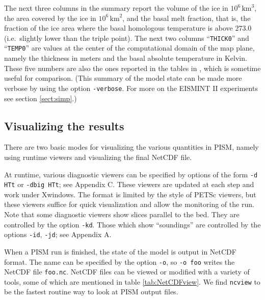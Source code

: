 \documentclass[11pt,final]{amsart}
\begin{document}
The next three columns in the summary report the volume of the ice in $10^6 \,\text{km}^3$, the area covered by the ice in $10^6\,\text{km}^2$, and the basal melt fraction, that is, the fraction of the ice area where the basal homologous temperature is above $273.0$ (i.e.~slightly lower than the triple point).  The next two columns ``\texttt{THICK0}'' and ``\texttt{TEMP0}'' are values at the center of the computational domain of the map plane, namely the thickness in meters and the basal absolute temperature in Kelvin.  These five numbers are also the ones reported in the tables in \cite{EISMINT00}, which is sometime useful for comparison.  (This summary of the model state can be made more verbose by using the option \verb|-verbose|.  For more on the EISMINT II experiments see section \ref{sect:simp}.)

\subsection{Visualizing the results}  There are two basic modes for visualizing the various quantities in PISM, namely using runtime viewers and visualizing the final NetCDF file.

At runtime, various diagnostic viewers can be specified by options of the form \verb|-d HTt| or \verb|-dbig HTt|; see Appendix C.  These viewers are updated at each step and work under Xwindows.  The format is limited by the style of PETSc viewers, but these viewers suffice for quick visualization and allow the monitoring of the run.  Note that some diagnostic viewers show slices parallel to the bed.  They are controlled by the option \verb|-kd|.  Those which show ``soundings'' are controlled by the options \verb|-id|, \verb|-jd|; see Appendix A.

When a PISM run is finished, the state of the model is output in NetCDF format.  The name can be specified by the option \verb|-o|, so \verb|-o foo| writes the NetCDF file \verb|foo.nc|.  NetCDF files can be viewed or modified with a variety of tools, some of which are mentioned in table \ref{tab:NetCDFview}.  We find \verb|ncview| to be the fastest routine way to look at PISM output files.
\end{document}
